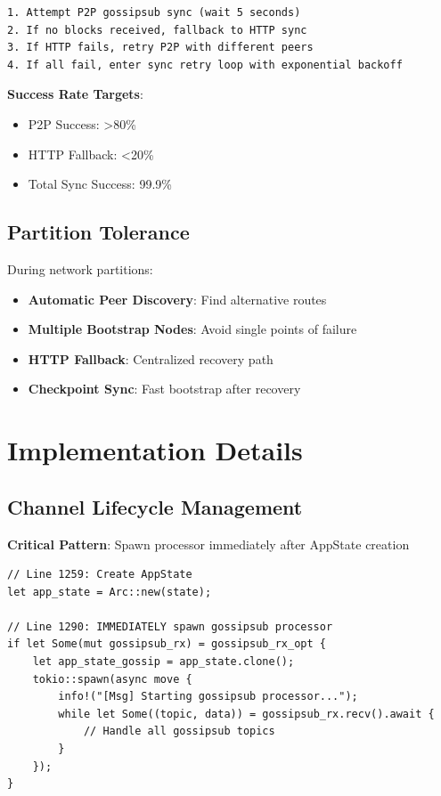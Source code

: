 \documentclass[11pt,a4paper]{article}
\begin{document}
\begin{verbatim}
1. Attempt P2P gossipsub sync (wait 5 seconds)
2. If no blocks received, fallback to HTTP sync
3. If HTTP fails, retry P2P with different peers
4. If all fail, enter sync retry loop with exponential backoff
\end{verbatim}

\textbf{Success Rate Targets}:
\begin{itemize}
\item P2P Success: >80\%
\item HTTP Fallback: <20\%
\item Total Sync Success: 99.9\%
\end{itemize}

\subsection{Partition Tolerance}

During network partitions:

\begin{itemize}
\item \textbf{Automatic Peer Discovery}: Find alternative routes
\item \textbf{Multiple Bootstrap Nodes}: Avoid single points of failure
\item \textbf{HTTP Fallback}: Centralized recovery path
\item \textbf{Checkpoint Sync}: Fast bootstrap after recovery
\end{itemize}

\section{Implementation Details}

\subsection{Channel Lifecycle Management}

\textbf{Critical Pattern}: Spawn processor immediately after AppState creation

\begin{verbatim}
// Line 1259: Create AppState
let app_state = Arc::new(state);

// Line 1290: IMMEDIATELY spawn gossipsub processor
if let Some(mut gossipsub_rx) = gossipsub_rx_opt {
    let app_state_gossip = app_state.clone();
    tokio::spawn(async move {
        info!("[Msg] Starting gossipsub processor...");
        while let Some((topic, data)) = gossipsub_rx.recv().await {
            // Handle all gossipsub topics
        }
    });
}
\end{verbatim}
\end{document}
